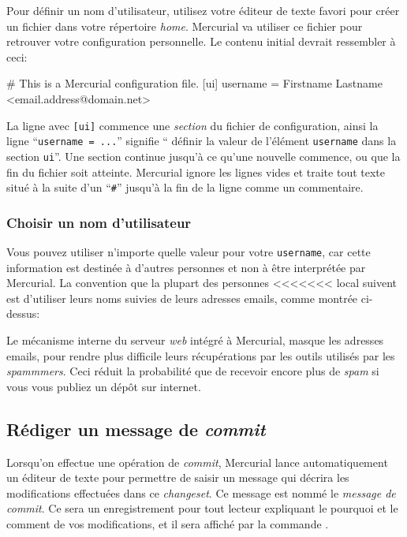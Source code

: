 Pour définir un nom d'utilisateur, utilisez votre éditeur de texte favori
pour créer un fichier  dans votre répertoire \textit{home}.
Mercurial va utiliser ce fichier pour retrouver votre configuration personnelle.
Le contenu initial devrait ressembler à ceci:
\begin{codesample2}
  # This is a Mercurial configuration file.
  [ui]
  username = Firstname Lastname <email.address@domain.net>
\end{codesample2}
La ligne avec \texttt{[ui]} commence une \emph{section} du fichier de
configuration, ainsi la ligne ``\texttt{username = ...}'' signifie ``
définir la valeur de l'élément \texttt{username} dans la section 
\texttt{ui}''. Une section continue jusqu'à ce qu'une nouvelle 
commence, ou que la fin du fichier soit atteinte. Mercurial ignore
les lignes vides et traite tout texte situé à la suite d'un  
``\texttt{\#}'' jusqu'à la fin de la ligne comme un commentaire.

\subsubsection{Choisir un nom d'utilisateur}

Vous pouvez utiliser n'importe quelle valeur pour votre \texttt{username},
car cette information est destinée à d'autres personnes et non à être
interprétée par Mercurial. La convention que la plupart des personnes
<<<<<<< local
suivent est d'utiliser leurs noms suivies de leurs adresses emails,
comme montrée ci-dessus:

\begin{note}
  Le mécanisme interne du serveur \textit{web} intégré à Mercurial,
  masque les adresses emails, pour rendre plus difficile leurs
  récupérations par les outils utilisés par les \textit{spammmers}.
  Ceci réduit la probabilité que de recevoir encore plus de 
  \textit{spam} si vous vous publiez un dépôt sur internet.
\end{note}

\subsection{Rédiger un message de \textit{commit}}

Lorsqu'on effectue une opération de \textit{commit}, Mercurial 
lance automatiquement un éditeur de texte pour permettre de saisir
un message qui décrira les modifications effectuées dans ce 
\textit{changeset}. Ce message est nommé le \emph{message de 
\textit{commit}}. Ce sera un enregistrement pour tout lecteur 
expliquant le pourquoi et le comment de vos modifications, et il sera
affiché par la commande .

